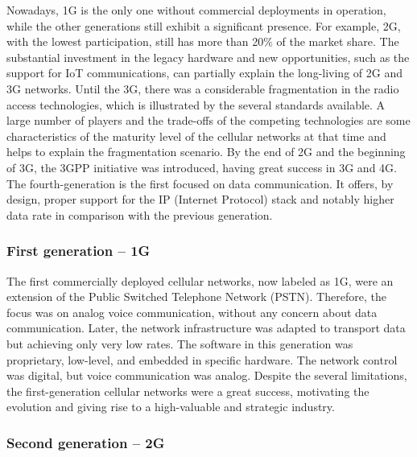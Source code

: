 Nowadays, 1G is the only one without commercial deployments in operation, while the other generations still exhibit a significant presence. For example, 2G, with the lowest participation, still has more than 20\% of the market share. The substantial investment in the legacy hardware and new opportunities, such as the support for IoT communications, can partially explain the long-living of 2G and 3G networks. Until the 3G, there was a considerable fragmentation in the radio access technologies, which is illustrated by the several standards available. A large number of players and the trade-offs of the competing technologies are some characteristics of the maturity level of the cellular networks at that time and helps to explain the fragmentation scenario. By the end of 2G and the beginning of 3G, the 3GPP initiative was introduced, having great success in 3G and 4G. The fourth-generation is the first focused on data communication. It offers, by design, proper support for the IP (Internet Protocol) stack and notably higher data rate in comparison with the previous generation.

\subsubsection*{First generation -- 1G}

The first commercially deployed cellular networks, now labeled as 1G, were an extension of the Public Switched Telephone Network (PSTN). Therefore, the focus was on analog voice communication, without any concern about data communication. Later, the network infrastructure was adapted to transport data but achieving only very low rates. The software in this generation was proprietary, low-level, and embedded in specific hardware. The network control was digital, but voice communication was analog. Despite the several limitations, the first-generation cellular networks were a great success, motivating the evolution and giving rise to a high-valuable and strategic industry.

\subsubsection*{Second generation -- 2G}

